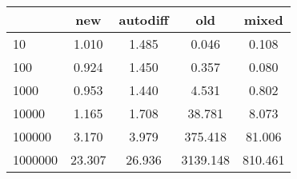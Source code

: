 \begin{tabular}{l|cccc}
\toprule
{} &    new &  autodiff &      old &   mixed \\
\midrule
10      &  1.010 &     1.485 &    0.046 &   0.108 \\
100     &  0.924 &     1.450 &    0.357 &   0.080 \\
1000    &  0.953 &     1.440 &    4.531 &   0.802 \\
10000   &  1.165 &     1.708 &   38.781 &   8.073 \\
100000  &  3.170 &     3.979 &  375.418 &  81.006 \\
1000000 & 23.307 &    26.936 & 3139.148 & 810.461 \\
\bottomrule
\end{tabular}
